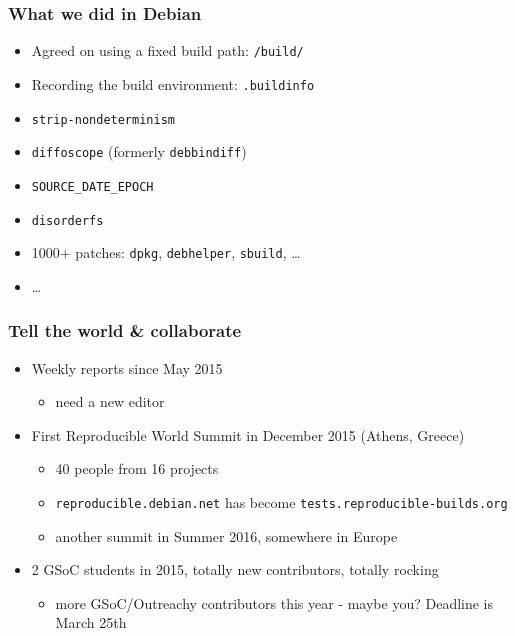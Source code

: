\documentclass[14pt,aspectratio=169]{beamer}
\begin{document}
\begin{frame}
 \frametitle{What we did in Debian}

 \begin{itemize}
  \item Agreed on using a fixed build path: \texttt{/build/}
  \item Recording the build environment: \texttt{.buildinfo}
  \item \texttt{strip-nondeterminism}
  \item \texttt{diffoscope} (formerly \texttt{debbindiff})
  \item \texttt{SOURCE\_DATE\_EPOCH}
  \item \texttt{disorderfs}
  \item 1000+ patches: \texttt{dpkg}, \texttt{debhelper}, \texttt{sbuild}, …
  \item …
 \end{itemize}
\end{frame}


\begin{frame}
 \frametitle{Tell the world \& collaborate}

 \begin{itemize}
  \item Weekly reports since May 2015
   \begin{itemize}
    \item need a new editor
   \end{itemize}
  \item<2-4> First Reproducible World Summit in December 2015 (Athens, Greece)
   \begin{itemize}
    \item<2-4> 40 people from 16 projects
    \item<2-4> \texttt{reproducible.debian.net} has become
  \texttt{tests.reproducible-builds.org}
  \item<3-4> another summit in Summer 2016, somewhere in Europe
   \end{itemize}
  \item<4> 2 GSoC students in 2015, totally new contributors, totally rocking
  \begin{itemize}
 \item<4> more GSoC/Outreachy contributors this year - maybe you? Deadline is
 March 25th
   \end{itemize}
 \end{itemize}
\end{frame}
\end{document}
